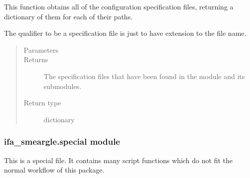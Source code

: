 \documentclass[letterpaper,10pt,english]{sphinxmanual}
\begin{document}
\begin{fulllineitems}
\label{\detokenize{docstrings/ifa_smeargle.runtime:ifa_smeargle.runtime.get_specification_files}}
This function obtains all of the configuration specification
files, returning a dictionary of them for each of their paths.

The qualifier to be a specification file is just to have 
extension to the file name.
\begin{quote}\begin{description}
\item[{Parameters}] \leavevmode
{} \textendash{} 

\item[{Returns}] \leavevmode
{} \textendash{} The specification files that have been found in the module
and its sub\sphinxhyphen{}modules.

\item[{Return type}] \leavevmode
dictionary

\end{description}\end{quote}

\end{fulllineitems}



\subsubsection{ifa\_smeargle.special module}
\label{\detokenize{docstrings/ifa_smeargle.special:module-ifa_smeargle.special}}\label{\detokenize{docstrings/ifa_smeargle.special:ifa-smeargle-special-module}}\label{\detokenize{docstrings/ifa_smeargle.special::doc}}
This is a special file. It contains many script functions which
do not fit the normal work\sphinxhyphen{}flow of this package.
\end{document}
